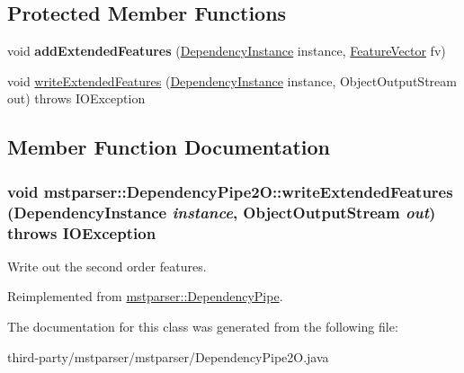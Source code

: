 \subsection*{Protected Member Functions}
\begin{DoxyCompactItemize}
\item 
\hypertarget{classmstparser_1_1DependencyPipe2O_acc094918e0f847d4ac0ce3f21c6662a0}{
void {\bfseries addExtendedFeatures} (\hyperlink{classmstparser_1_1DependencyInstance}{DependencyInstance} instance, \hyperlink{classmstparser_1_1FeatureVector}{FeatureVector} fv)}
\label{classmstparser_1_1DependencyPipe2O_acc094918e0f847d4ac0ce3f21c6662a0}

\item 
void \hyperlink{classmstparser_1_1DependencyPipe2O_a1a2edeb57ac26d9c0c3ce7026393ef29}{writeExtendedFeatures} (\hyperlink{classmstparser_1_1DependencyInstance}{DependencyInstance} instance, ObjectOutputStream out)  throws IOException 
\end{DoxyCompactItemize}


\subsection{Member Function Documentation}
\hypertarget{classmstparser_1_1DependencyPipe2O_a1a2edeb57ac26d9c0c3ce7026393ef29}{
\subsubsection[{writeExtendedFeatures}]{\setlength{\rightskip}{0pt plus 5cm}void mstparser::DependencyPipe2O::writeExtendedFeatures ({\bf DependencyInstance} {\em instance}, \/  ObjectOutputStream {\em out})  throws IOException }}
\label{classmstparser_1_1DependencyPipe2O_a1a2edeb57ac26d9c0c3ce7026393ef29}
Write out the second order features. 

Reimplemented from \hyperlink{classmstparser_1_1DependencyPipe_a08ecc2b509221d129c2e46fc143a80bc}{mstparser::DependencyPipe}.



The documentation for this class was generated from the following file:\begin{DoxyCompactItemize}
\item 
third-\/party/mstparser/mstparser/DependencyPipe2O.java\end{DoxyCompactItemize}
